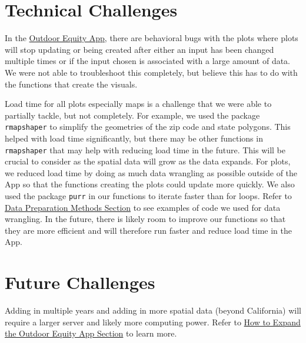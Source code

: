 \documentclass[
  11 pt,
  openany]{book}
\begin{document}
\hypertarget{technical-challenges}{%
\section{Technical Challenges}\label{technical-challenges}}

In the \href{https://shinyapps.bren.ucsb.edu/oe_app/}{Outdoor Equity App}, there are behavioral bugs with the plots where plots will stop updating or being created after either an input has been changed multiple times or if the input chosen is associated with a large amount of data. We were not able to troubleshoot this completely, but believe this has to do with the functions that create the visuals.

Load time for all plots especially maps is a challenge that we were able to partially tackle, but not completely. For example, we used the package \texttt{rmapshaper} \citep{R-rmapshaper} to simplify the geometries of the zip code and state polygons. This helped with load time significantly, but there may be other functions in \texttt{rmapshaper} \citep{R-rmapshaper} that may help with reducing load time in the future. This will be crucial to consider as the spatial data will grow as the data expands. For plots, we reduced load time by doing as much data wrangling as possible outside of the App so that the functions creating the plots could update more quickly. We also used the package \texttt{purr}\citep{R-purrr} in our functions to iterate faster than for loops. Refer to \protect\hyperlink{data-preparation-methods}{Data Preparation Methods Section} to see examples of code we used for data wrangling. In the future, there is likely room to improve our functions so that they are more efficient and will therefore run faster and reduce load time in the App.

\hypertarget{future-challenges}{%
\section{Future Challenges}\label{future-challenges}}

Adding in multiple years and adding in more spatial data (beyond California) will require a larger server and likely more computing power. Refer to \protect\hyperlink{how-to-expand-the-outdoor-equity-app}{How to Expand the Outdoor Equity App Section} to learn more.

  
\end{document}
